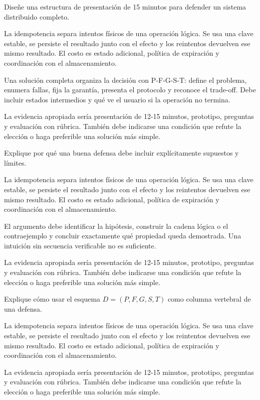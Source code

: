 \documentclass[variant=guia,cover=institutional,mode=screen]{ua-engineering-v6-article}
\begin{document}
\begin{uaexercise}
Diseñe una estructura de presentación de 15 minutos para defender un sistema distribuido completo.
\end{uaexercise}
\begin{uaanswer}
La idempotencia separa intentos físicos de una operación lógica. Se usa una clave estable, se persiste el resultado junto con el efecto y los reintentos devuelven ese mismo resultado. El costo es estado adicional, política de expiración y coordinación con el almacenamiento.

Una solución completa organiza la decisión con P-F-G-S-T: define el problema, enumera fallas, fija la garantía, presenta el protocolo y reconoce el trade-off. Debe incluir estados intermedios y qué ve el usuario si la operación no termina.

La evidencia apropiada sería presentación de 12-15 minutos, prototipo, preguntas y evaluación con rúbrica. También debe indicarse una condición que refute la elección o haga preferible una solución más simple.
\end{uaanswer}

\begin{uaexercise}
Explique por qué una buena defensa debe incluir explícitamente supuestos y límites.
\end{uaexercise}
\begin{uaanswer}
La idempotencia separa intentos físicos de una operación lógica. Se usa una clave estable, se persiste el resultado junto con el efecto y los reintentos devuelven ese mismo resultado. El costo es estado adicional, política de expiración y coordinación con el almacenamiento.

El argumento debe identificar la hipótesis, construir la cadena lógica o el contraejemplo y concluir exactamente qué propiedad queda demostrada. Una intuición sin secuencia verificable no es suficiente.

La evidencia apropiada sería presentación de 12-15 minutos, prototipo, preguntas y evaluación con rúbrica. También debe indicarse una condición que refute la elección o haga preferible una solución más simple.
\end{uaanswer}

\begin{uaexercise}
Explique cómo usar el esquema $D=(P,F,G,S,T)$ como columna vertebral de una defensa.
\end{uaexercise}
\begin{uaanswer}
La idempotencia separa intentos físicos de una operación lógica. Se usa una clave estable, se persiste el resultado junto con el efecto y los reintentos devuelven ese mismo resultado. El costo es estado adicional, política de expiración y coordinación con el almacenamiento.

La evidencia apropiada sería presentación de 12-15 minutos, prototipo, preguntas y evaluación con rúbrica. También debe indicarse una condición que refute la elección o haga preferible una solución más simple.
\end{uaanswer}
\end{document}

